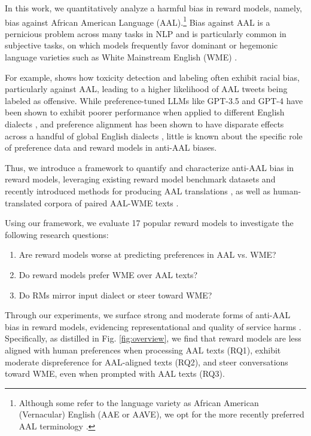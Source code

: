 In this work, we quantitatively analyze a harmful bias in reward models, namely, bias against African American Language (AAL).\footnote{Although some refer to the language variety as African American (Vernacular) English (AAE or AAVE), we opt for the more recently preferred AAL terminology \citep{lanehart_2015}.}
Bias against AAL is a pernicious problem across many tasks in NLP and is particularly common in subjective tasks, on which models frequently favor dominant or hegemonic language varieties such as White Mainstream English (WME) \cite{deas_evaluation_2023}.

For example, \citet{sap_risk_2019} shows how toxicity detection and labeling often exhibit racial bias, particularly against AAL, leading to a higher likelihood of AAL tweets being labeled as offensive. 
While preference-tuned LLMs like GPT-3.5 and GPT-4 have been shown to exhibit poorer performance when applied to different English dialects \cite{fleisig2024linguisticbiaschatgptlanguage}, and preference alignment has been shown to have disparate effects across a handful of global English dialects \citep{ryan-etal-2024-unintended}, little is known about the specific role of preference data and reward models in anti-AAL biases. 

Thus, we introduce a framework to quantify and characterize anti-AAL bias in reward models, leveraging existing reward model benchmark datasets and recently introduced methods for producing AAL translations \citep{ziems_value_2022, deas2024phonate}, as well as human-translated corpora of paired AAL-WME texts \citep{deas_evaluation_2023, groenwold-etal-2020-investigating}.

Using our framework, we evaluate 17 popular reward models to investigate the following research questions:
\begin{enumerate}[leftmargin=2.6em,itemsep=-0.5em,topsep=0em,label=\textbf{RQ\arabic*}:]
    \item Are reward models worse at predicting preferences in AAL vs. WME?
    \item Do reward models prefer WME over AAL texts?
    \item Do RMs mirror input dialect or steer toward WME?
\end{enumerate}

Through our experiments, we surface strong and moderate forms of anti-AAL bias in reward models, evidencing representational and quality of service harms \citep{blodgett_language_2020, shelby_sociotechnical_2023}. Specifically, as distilled in Fig. \ref{fig:overview}, we find that reward models are less aligned with human preferences when processing AAL texts (RQ1), exhibit moderate dispreference for AAL-aligned texts (RQ2), and steer conversations toward WME, even when prompted with AAL texts (RQ3). 

